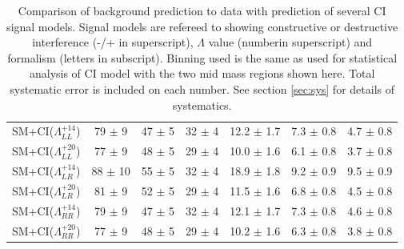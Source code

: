 \begin {table}[h]
\begin{center}
\begin{tabular}{  l | c c c | c c c  }
			\hline
			SM+CI($\Lambda^{+14}_{LL}$) & 79 $\pm$ 9 & 47 $\pm$ 5 & 32 $\pm$ 4 & 12.2 $\pm$ 1.7 & 7.3 $\pm$ 0.8 & 4.7 $\pm$ 0.8 \\
			SM+CI($\Lambda^{+20}_{LL}$) & 77 $\pm$ 9 & 48 $\pm$ 5 & 29 $\pm$ 4 & 10.0 $\pm$ 1.6 & 6.1 $\pm$ 0.8 & 3.7 $\pm$ 0.8 \\
			SM+CI($\Lambda^{+14}_{LR}$) & 88 $\pm$ 10 & 55 $\pm$ 5 & 32 $\pm$ 4 & 18.9 $\pm$ 1.8 & 9.2 $\pm$ 0.9 & 9.5 $\pm$ 0.9 \\
			SM+CI($\Lambda^{+20}_{LR}$) & 81 $\pm$ 9 & 52 $\pm$ 5 & 29 $\pm$ 4 & 11.5 $\pm$ 1.6 & 6.8 $\pm$ 0.8 & 4.5 $\pm$ 0.8 \\
			SM+CI($\Lambda^{+14}_{RR}$) & 79 $\pm$ 9 & 47 $\pm$ 5 & 32 $\pm$ 4 & 12.1 $\pm$ 1.7 & 7.3 $\pm$ 0.8 & 4.6 $\pm$ 0.8 \\
			SM+CI($\Lambda^{+20}_{RR}$) & 77 $\pm$ 9 & 48 $\pm$ 5 & 29 $\pm$ 4 & 10.2 $\pm$ 1.6 & 6.3 $\pm$ 0.8 & 3.8 $\pm$ 0.8 \\
			\hline
			\hline
		\end{tabular}
	  	\caption{Comparison of background prediction to data with prediction of several CI signal models. Signal models are refereed to showing constructive or destructive interference (-/+ in superscript), $\Lambda$ value (numberin superscript) and formalism (letters in subscript). Binning used is the same as used for statistical analysis of CI model with the two mid mass regions shown here. Total systematic error is included on each number. See section \ref{sec:sys} for details of systematics.}
	  	\label{tab:CI_results2}
	  	\end{center}
	\end {table}




